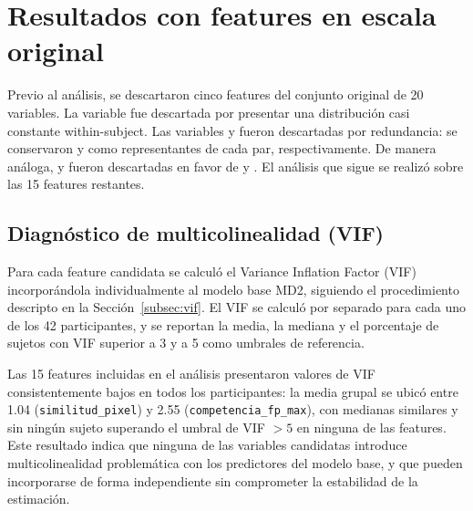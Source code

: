 \section{Resultados con features en escala original}
\label{sec:resultados_features_original}

Previo al análisis, se descartaron cinco features del conjunto 
original de 20 variables. La variable  
fue descartada por presentar una distribución casi constante 
within-subject. Las variables  
y  fueron descartadas por redundancia: 
se conservaron  y 
 como representantes de cada par, 
respectivamente. De manera análoga,  
y  fueron descartadas en favor de 
 y . El análisis 
que sigue se realizó sobre las 15 features restantes.

\subsection{Diagnóstico de multicolinealidad (VIF)}

Para cada feature candidata se calculó el Variance Inflation 
Factor (VIF) incorporándola individualmente al modelo base MD2, 
siguiendo el procedimiento descripto en la Sección~\ref{subsec:vif}. 
El VIF se calculó por separado para cada uno de los 42 
participantes, y se reportan la media, la mediana y el porcentaje 
de sujetos con VIF superior a 3 y a 5 como umbrales de referencia.

Las 15 features incluidas en el análisis presentaron valores de 
VIF consistentemente bajos en todos los participantes: la media 
grupal se ubicó entre 1.04 (\texttt{similitud\_pixel}) y 2.55 
(\texttt{competencia\_fp\_max}), con medianas similares y sin 
ningún sujeto superando el umbral de VIF $> 5$ en ninguna de 
las features. Este resultado indica que ninguna de las variables 
candidatas introduce multicolinealidad problemática con los 
predictores del modelo base, y que pueden incorporarse de forma 
independiente sin comprometer la estabilidad de la estimación.

